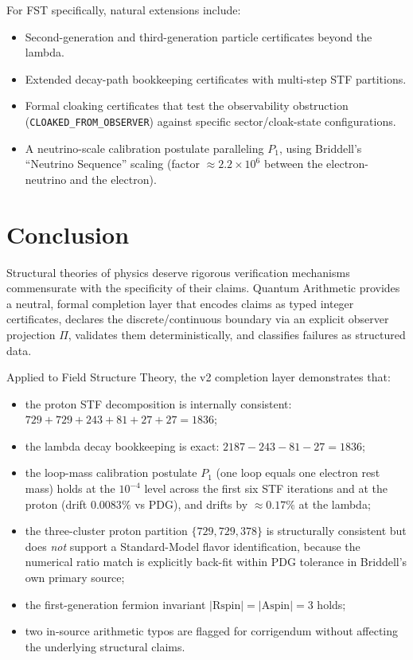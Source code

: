 \documentclass[12pt,a4paper]{article}
\begin{document}
For FST specifically, natural extensions include:
\begin{itemize}[nosep]
  \item Second-generation and third-generation particle certificates
        beyond the lambda.
  \item Extended decay-path bookkeeping certificates with multi-step
        STF partitions.
  \item Formal cloaking certificates that test the observability
        obstruction (\texttt{CLOAKED\_FROM\_OBSERVER}) against
        specific sector/cloak-state configurations.
  \item A neutrino-scale calibration postulate paralleling $P_1$,
        using Briddell's ``Neutrino Sequence'' scaling (factor
        $\approx 2.2 \times 10^6$ between the electron-neutrino and
        the electron).
\end{itemize}


\section{Conclusion}

Structural theories of physics deserve rigorous verification
mechanisms commensurate with the specificity of their claims.
Quantum Arithmetic provides a neutral, formal completion layer
that encodes claims as typed integer certificates, declares the
discrete/continuous boundary via an explicit observer projection
$\Pi$, validates them deterministically, and classifies failures
as structured data.

Applied to Field Structure Theory, the v2 completion layer
demonstrates that:
\begin{itemize}[nosep]
  \item the proton STF decomposition is internally consistent:
        $729 + 729 + 243 + 81 + 27 + 27 = 1836$;
  \item the lambda decay bookkeeping is exact:
        $2187 - 243 - 81 - 27 = 1836$;
  \item the loop-mass calibration postulate $P_1$ (one loop equals
        one electron rest mass) holds at the $10^{-4}$ level across
        the first six STF iterations and at the proton (drift
        $0.0083\%$ vs PDG), and drifts by $\approx 0.17\%$ at the
        lambda;
  \item the three-cluster proton partition $\{729, 729, 378\}$ is
        structurally consistent but does \emph{not} support a
        Standard-Model flavor identification, because the numerical
        ratio match is explicitly back-fit within PDG tolerance in
        Briddell's own primary source;
  \item the first-generation fermion invariant
        $|\text{Rspin}| = |\text{Aspin}| = 3$ holds;
  \item two in-source arithmetic typos are flagged for corrigendum
        without affecting the underlying structural claims.
\end{itemize}
\end{document}

